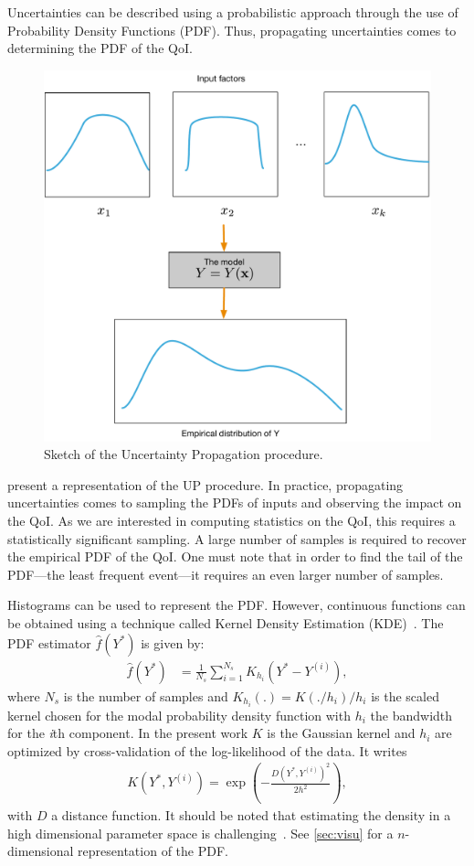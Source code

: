 Uncertainties can be described using a probabilistic approach through the use of Probability Density Functions (PDF). Thus, propagating uncertainties comes to determining the PDF of the QoI.

\begin{figure}[!h]
\centering
\includegraphics[width=0.7\linewidth,keepaspectratio]{fig/literature/propagation.pdf}
\caption{Sketch of the Uncertainty Propagation procedure.}
\label{fig:UP}
\end{figure}

 present a representation of the UP procedure. In practice, propagating uncertainties comes to sampling the PDFs of inputs and observing the impact on the QoI. As we are interested in computing statistics on the QoI, this requires a statistically significant sampling. A large number of samples is required to recover the empirical PDF of the QoI. One must note that in order to find the tail of the PDF---the least frequent event---it requires an even larger number of samples.

Histograms can be used to represent the PDF. However, continuous functions can be obtained using a technique called Kernel Density Estimation (KDE)~\cite{Wand1995}. The PDF estimator $\hat{f}(Y^*)$ is given by:
\begin{align}
\hat{f}(Y^*)&= \frac{1}{N_{s}}\sum_{i=1}^{N_{s}} K_{h_i}(Y^*-Y^{(i)}),
\end{align}
\noindent where $N_s$ is the number of samples and $K_{h_i}(.) = K(./h_i)/h_i$ is the scaled kernel chosen for the modal probability density function with $h_{i}$ the bandwidth for the \emph{i}th component. In the present work $K$ is the Gaussian kernel and $h_{i}$ are optimized by cross-validation of the log-likelihood of the data. It writes
\begin{align}
K\left(Y^*,Y^{(i)}\right) = \exp\left( - \frac{D\left(Y^*,Y^{(i)}\right)^2}{2h^2} \right), \label{eq:kde}
\end{align}
\noindent with $D$ a distance function. It should be noted that estimating the density in a high dimensional parameter space is challenging~\citep{Scholkopf1999,Scott2015}. See \cref{sec:visu} for a $n$-dimensional representation of the PDF.

